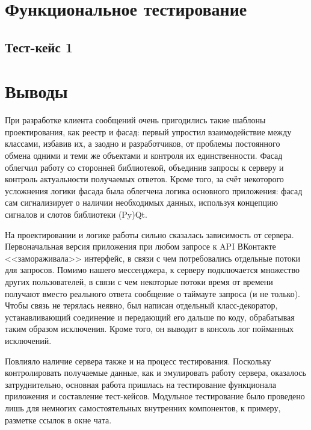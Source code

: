 \documentclass[12pt]{article}
\begin{document}



\newpage
\section{Функциональное тестирование}
\subsection{Тест-кейс 1}




\newpage
\section{Выводы}
\indent При разработке клиента сообщений очень пригодились такие шаблоны проектирования, как реестр и фасад: первый упростил взаимодействие между классами, избавив их, а заодно и разработчиков, от проблемы постоянного обмена одними и теми же объектами и контроля их единственности. Фасад облегчил работу со сторонней библиотекой, объединив запросы к серверу и контроль актуальности получаемых ответов. Кроме того, за счёт некоторого усложнения логики фасада была облегчена логика основного приложения: фасад сам сигнализирует о наличии необходимых данных, используя концепцию сигналов и слотов библиотеки (Py)Qt. \newline

На проектировании и логике работы сильно сказалась зависимость от сервера. Первоначальная версия приложения при любом запросе к API ВКонтакте <<замораживала>> интерфейс, в связи с чем потребовались отдельные потоки для запросов. Помимо нашего мессенджера, к серверу подключается множество других пользователей, в связи с чем некоторые потоки время от времени получают вместо реального ответа сообщение о таймауте запроса (и не только). Чтобы связь не терялась неявно, был написан отдельный класс-декоратор, устанавливающий соединение и передающий его дальше по коду, обрабатывая таким образом исключения. Кроме того, он выводит в консоль лог пойманных исключений. \newline

Повлияло наличие сервера также и на процесс тестирования. Поскольку контролировать получаемые данные, как и эмулировать работу сервера, оказалось затруднительно, основная работа пришлась на тестирование функционала приложения и составление тест-кейсов. Модульное тестирование было проведено лишь для немногих самостоятельных внутренних компонентов, к примеру, разметке ссылок в окне чата.
\end{document}
